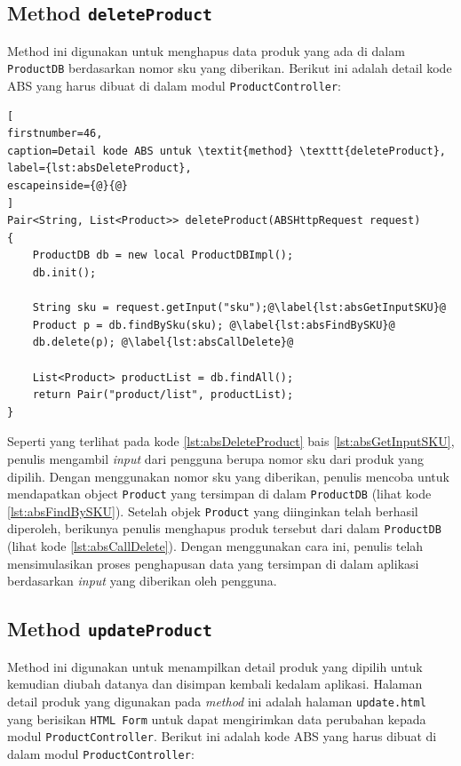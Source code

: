 \subsection{Method \texttt{deleteProduct}}
Method ini digunakan untuk menghapus data produk yang ada di dalam \texttt{ProductDB} berdasarkan nomor sku yang diberikan. Berikut ini adalah detail kode ABS yang harus dibuat di dalam modul \texttt{ProductController}:

\begin{lstlisting}[
firstnumber=46,
caption=Detail kode ABS untuk \textit{method} \texttt{deleteProduct},
label={lst:absDeleteProduct},
escapeinside={@}{@}
]
Pair<String, List<Product>> deleteProduct(ABSHttpRequest request)
{
	ProductDB db = new local ProductDBImpl();
	db.init();
	
	String sku = request.getInput("sku");@\label{lst:absGetInputSKU}@
	Product p = db.findBySku(sku); @\label{lst:absFindBySKU}@
	db.delete(p); @\label{lst:absCallDelete}@
	
	List<Product> productList = db.findAll();
	return Pair("product/list", productList);
}
\end{lstlisting}

Seperti yang terlihat pada kode \ref{lst:absDeleteProduct} bais \ref{lst:absGetInputSKU}, penulis mengambil \textit{input} dari pengguna berupa nomor sku dari produk yang dipilih. Dengan menggunakan nomor sku yang diberikan, penulis mencoba untuk mendapatkan object \texttt{Product} yang tersimpan di dalam \texttt{ProductDB} (lihat kode \ref{lst:absFindBySKU}). Setelah objek \texttt{Product} yang diinginkan telah berhasil diperoleh, berikunya penulis menghapus produk tersebut dari dalam \texttt{ProductDB} (lihat kode \ref{lst:absCallDelete}). Dengan menggunakan cara ini, penulis telah mensimulasikan proses penghapusan data yang tersimpan di dalam aplikasi berdasarkan \textit{input} yang diberikan oleh pengguna.
 
\subsection{Method \texttt{updateProduct}}

Method ini digunakan untuk menampilkan detail produk yang dipilih untuk kemudian diubah datanya dan disimpan kembali kedalam aplikasi. Halaman detail produk yang digunakan pada \textit{method} ini adalah halaman \texttt{update.html} yang berisikan \texttt{HTML Form} untuk dapat mengirimkan data perubahan kepada modul \texttt{ProductController}. Berikut ini adalah kode ABS yang harus dibuat di dalam modul \texttt{ProductController}:


